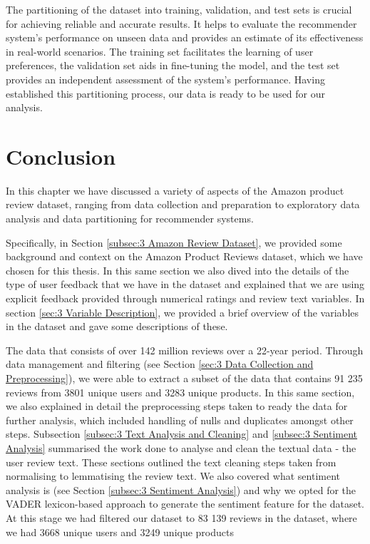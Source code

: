   The partitioning of the dataset into training, validation, and test sets is crucial for achieving reliable and accurate results. It helps to evaluate the recommender system's performance on unseen data and provides an estimate of its effectiveness in real-world scenarios. The training set facilitates the learning of user preferences, the validation set aids in fine-tuning the model, and the test set provides an independent assessment of the system's performance. Having established this partitioning process, our data is ready to be used for our analysis. 




\section{Conclusion}
\label{sec:3 Conclusion}

In this chapter we have discussed a variety of aspects of the Amazon product review dataset, ranging from data collection and preparation to exploratory data analysis and data partitioning for recommender systems. 

Specifically, in Section \ref{subsec:3 Amazon Review Dataset}, we provided some background and context on the Amazon Product Reviews dataset, which we have chosen for this thesis. In this same section we also dived into the details of the type of user feedback that we have in the dataset and explained that we are using explicit feedback provided through numerical ratings and review text variables. In section \ref{sec:3 Variable Description}, we provided a brief overview of the variables in the dataset and gave some descriptions of these. 

The data that consists of over 142 million reviews over a 22-year period. Through data management and filtering (see Section \ref{sec:3 Data Collection and Preprocessing}), we were able to extract a subset of the data that contains 91 235 reviews from 3801 unique users and 3283 unique products. In this same section, we also explained in detail the preprocessing steps taken to ready the data for further analysis, which included handling of nulls and duplicates amongst other steps. Subsection \ref{subsec:3 Text Analysis and Cleaning} and \ref{subsec:3 Sentiment Analysis} summarised the work done to analyse and clean the textual data - the user review text. These sections outlined the text cleaning steps taken from normalising  to lemmatising the review text. We also covered what sentiment analysis is (see Section \ref{subsec:3 Sentiment Analysis}) and why we opted for the VADER lexicon-based approach to generate the sentiment feature for the dataset. At this stage we had filtered our dataset to 83 139 reviews in the dataset, where we had 3668 unique users and 3249 unique products 

